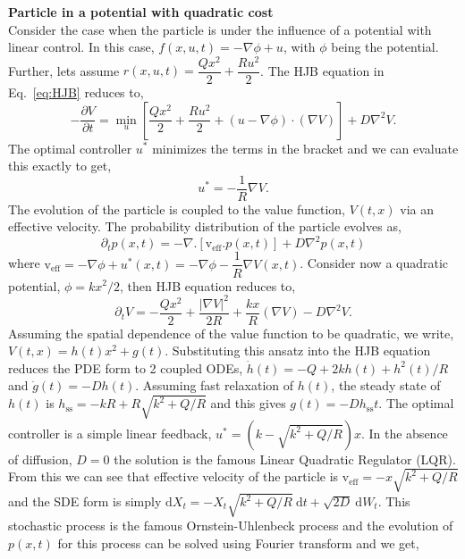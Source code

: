 \documentclass[12pt]{article}
\def\d{\mathrm{d}}
\def\q{\mathbf{q}}
\def\grad{\nabla}
\def\alpha{R}
\def\q{Q}
\def\ss{\mathrm{ss}}
\begin{document}
\begin{singlespace}
\begin{tcolorbox}[breakable, enforce breakable,colback=gray!20!white,colframe=white,arc=8pt,outer arc=8pt]
    \textbf{\textsf{Particle in a potential with quadratic cost}}\\[5pt]
    Consider the case when the particle is under the influence of a potential with linear control. In this case, $f(x, u, t) = -\grad \phi + u$, with $\phi$ being the potential. Further, lets assume $r(x, u, t) = \dfrac{\q x^2}{2} + \dfrac{\alpha u^2}{2}$. The HJB equation in Eq.~\ref{eq:HJB} reduces to,
    \[
    -\frac{\partial V}{\partial t} = \min_{u} \left[\frac{\q x^2}{2}+ \frac{\alpha u^2}{2} + (u-\nabla \phi) \cdot (\grad V) \right] + D \grad^2 V.
    \]
    The optimal controller $u^*$ minimizes the terms in the bracket and we can evaluate this exactly to get,
    \[
    u^* = - \frac{1}{\alpha} \grad V.
    \]
     The evolution of the particle is coupled to the value function, $V(t, x)$ via an effective velocity. The probability distribution of the particle evolves as,
     \[
     \partial_tp(x,t) = -\grad.[\text{v}_{\text{eff}}.p(x,t)]+D\grad^2p(x,t)
     \]
    where $\text{v}_{\text{eff}} = -\grad\phi + u^*(x,t) = -\grad\phi-\dfrac{1}{\alpha}\grad V(x,t)$. Consider now a quadratic potential, $\phi = kx^2/2$, then HJB equation reduces to,
    \[
    \partial_t V = -\frac{\q x^2}{2} + \frac{|\grad V|^2}{2 \alpha} + \frac{kx}{\alpha} (\grad V) - D \grad^2 V.
    \]
    Assuming the spatial dependence of the value function to be quadratic, we write, $V(t, x) = h(t) x^2 + g(t)$. Substituting this ansatz into the HJB equation reduces the PDE form to 2 coupled ODEs, $\dot{h}(t) = -\q + 2kh(t) + h^2(t)/\alpha$ and $\dot{g}(t) = - Dh(t)$. Assuming fast relaxation of $h(t)$, the steady state of $h(t)$ is $h_\ss = -k\alpha + \alpha\sqrt{k^2 + \q/\alpha}$ and this gives $g(t) = -Dh_\ss t$. The optimal controller is a simple linear feedback, $u^* = (k - \sqrt{k^2 + \q/\alpha}) x$. In the absence of diffusion, $D = 0$ the solution is the famous Linear Quadratic Regulator (LQR). From this we can see that effective velocity of the particle is $\text{v}_{\text{eff}} = -x\sqrt{k^2 + \q/\alpha}$ and the SDE form is simply $\d X_t = -X_t\sqrt{k^2 + \q/\alpha} \ \d t + \sqrt{2D}\ \d W_t$. This stochastic process is the famous Ornstein-Uhlenbeck process and the evolution of $p(x, t)$ for this process can be solved using Fourier transform and we get,

\end{tcolorbox}
\end{singlespace}
\end{document}
